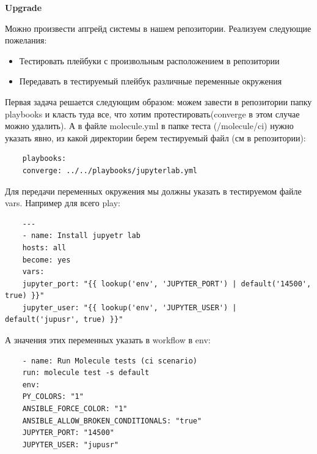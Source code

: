 \documentclass[12pt]{article}
\begin{document}
{\Large\bfseries Upgrade} \par
Можно произвести апгрейд системы в нашем репозитории. Реализуем следующие пожелания:\\
\begin{itemize}
	\item Тестировать плейбуки с произвольным расположением в репозитории
	\item Передавать в тестируемый плейбук различные переменные окружения
\end{itemize}\par\vspace{10pt}
Первая задача решается следующим образом: можем завести в репозитории папку playbooks и класть туда все, что хотим протестировать(converge в этом случае можно удалить). А в файле molecule.yml в папке теста (/molecule/ci) нужно указать явно, из какой директории берем тестируемый файл (см в репозитории):\\
\begin{lstlisting}
	playbooks:
	converge: ../../playbooks/jupyterlab.yml
\end{lstlisting}\par\vspace{10pt}
Для передачи переменных окружения мы должны указать в тестируемом файле vars. Например для всего play:
\begin{lstlisting}
	---
	- name: Install jupyetr lab
	hosts: all
	become: yes 
	vars:
	jupyter_port: "{{ lookup('env', 'JUPYTER_PORT') | default('14500', true) }}"
	jupyter_user: "{{ lookup('env', 'JUPYTER_USER') | default('jupusr', true) }}"
\end{lstlisting}\par
А значения этих переменных указать в workflow в env:\\
\begin{lstlisting}
	- name: Run Molecule tests (ci scenario)
	run: molecule test -s default
	env:
	PY_COLORS: "1"
	ANSIBLE_FORCE_COLOR: "1"
	ANSIBLE_ALLOW_BROKEN_CONDITIONALS: "true"
	JUPYTER_PORT: "14500"
	JUPYTER_USER: "jupusr"
\end{lstlisting}\par
\end{document}
